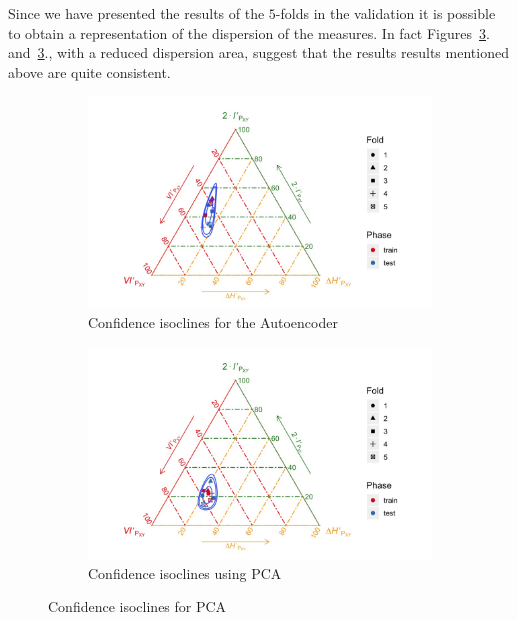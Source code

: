 Since we have presented the results of the $5$-folds in the validation it is possible to obtain a representation of the dispersion of the measures. 
In fact Figures~\ref{fig:figure_Knn_Iono_Confidence}. and~\ref{fig:figure_Knn_Iono_Confidence}., 
 with a reduced dispersion area, 
suggest that the results results mentioned above are quite consistent. 
%
\begin{figure}[H]
\begin{subfigure}{\textwidth}  
	\centering
	\includegraphics[width=\linewidth]{Figuras_tfg/ET_Iono_Auto_Knn_Confidence}
	\caption{Confidence isoclines for the Autoencoder }
	\label{fig:figure_Knn_Iono_ET_Auto_Confidence}
\end{subfigure}
%
\begin{subfigure}{\textwidth}  
	\centering
	\includegraphics[width=\linewidth]{Figuras_tfg/ET_Iono_PCA_Knn_Confidence}
	\caption{Confidence isoclines using PCA }
	\label{fig:figure_Knn_Iono_ET_PCA_Confidence}
\end{subfigure}
\caption{Confidence isoclines for PCA}
\label{fig:figure_Knn_Iono_Confidence}
\end{figure}

